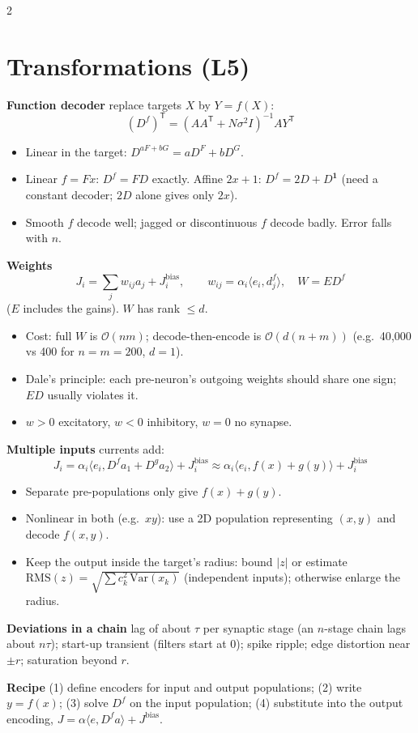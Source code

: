 \documentclass[9pt,letterpaper]{extarticle}
\newcommand{\sub}[1]{\par\vspace{2pt}\textbf{#1}\quad}
\newcommand{\T}{\mathsf{T}}
\newcommand{\Jb}{J^{\mathrm{bias}}}
\begin{document}
\begin{multicols}{2}
\section{Transformations (L5)}
\sub{Function decoder} replace targets $X$ by $Y = f(X)$:
\[
\boxed{(D^f)^\T = (AA^\T + N\sigma^2 I)^{-1}AY^\T}
\]
\begin{itemize}
\item Linear in the target: $D^{aF + bG} = aD^F + bD^G$.
\item Linear $f = Fx$: $D^f = FD$ exactly. Affine $2x + 1$: $D^f = 2D + D^{\mathbf 1}$ (need a constant decoder; $2D$ alone gives only $2x$).
\item Smooth $f$ decode well; jagged or discontinuous $f$ decode badly. Error falls with $n$.
\end{itemize}
\sub{Weights}
\[
J_i = \sum_j w_{ij}a_j + \Jb_i,\qquad w_{ij} = \alpha_i\langle e_i, d^f_j\rangle,\quad W = ED^f
\]
($E$ includes the gains). $W$ has rank $\le d$.
\begin{itemize}
\item Cost: full $W$ is $\mathcal O(nm)$; decode-then-encode is $\mathcal O(d(n + m))$ (e.g.\ 40{,}000 vs 400 for $n = m = 200$, $d = 1$).
\item Dale's principle: each pre-neuron's outgoing weights should share one sign; $ED$ usually violates it.
\item $w > 0$ excitatory, $w < 0$ inhibitory, $w = 0$ no synapse.
\end{itemize}
\sub{Multiple inputs} currents add:
\[
J_i = \alpha_i\langle e_i, D^f a_1 + D^g a_2\rangle + \Jb_i \approx \alpha_i\langle e_i, f(x) + g(y)\rangle + \Jb_i
\]
\begin{itemize}
\item Separate pre-populations only give $f(x) + g(y)$.
\item Nonlinear in both (e.g.\ $xy$): use a 2D population representing $(x, y)$ and decode $f(x, y)$.
\item Keep the output inside the target's radius: bound $|z|$ or estimate $\mathrm{RMS}(z) = \sqrt{\sum c_k^2\,\mathrm{Var}(x_k)}$ (independent inputs); otherwise enlarge the radius.
\end{itemize}
\sub{Deviations in a chain} lag of about $\tau$ per synaptic stage (an $n$-stage chain lags about $n\tau$); start-up transient (filters start at 0); spike ripple; edge distortion near $\pm r$; saturation beyond $r$.
\sub{Recipe} (1) define encoders for input and output populations; (2) write $y = f(x)$; (3) solve $D^f$ on the input population; (4) substitute into the output encoding, $J = \alpha\langle e, D^f a\rangle + \Jb$.


\end{multicols}
\end{document}
